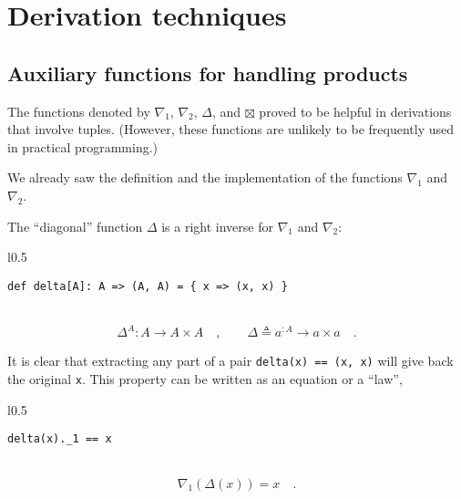 \section{Derivation techniques}

\subsection{Auxiliary functions for handling products}

The functions denoted by $\nabla_{1}$, $\nabla_{2}$, $\Delta$,
and $\boxtimes$ proved to be helpful in derivations that involve
tuples. (However, these functions are unlikely to be frequently used
in practical programming.) 

We already saw the definition and the implementation of the functions
$\nabla_{1}$ and $\nabla_{2}$. 

The \textsf{``}diagonal\textsf{''} function $\Delta$ is a right inverse for $\nabla_{1}$
and $\nabla_{2}$:

\begin{wrapfigure}{l}{0.5\columnwidth}%
\vspace{-0.65\baselineskip}
\begin{lstlisting}
def delta[A]: A => (A, A) = { x => (x, x) }
\end{lstlisting}

\vspace{-0.25\baselineskip}
\end{wrapfigure}%

~\vspace{-1.15\baselineskip}
\[
\Delta^{A}:A\rightarrow A\times A\quad,\quad\quad\Delta\triangleq a^{:A}\rightarrow a\times a\quad.
\]
\vspace{-1.15\baselineskip}

It is clear that extracting any part of a pair \lstinline!delta(x) == (x, x)!
will give back the original \lstinline!x!. This property can be written
as an equation or a \textsf{``}law\textsf{''},

\begin{wrapfigure}{l}{0.5\columnwidth}%
\vspace{-0.65\baselineskip}
\begin{lstlisting}
delta(x)._1 == x
\end{lstlisting}

\vspace{-0.25\baselineskip}
\end{wrapfigure}%

~\vspace{-0.35\baselineskip}
\[
\nabla_{1}(\Delta(x))=x\quad.
\]
\vspace{-0.85\baselineskip}

